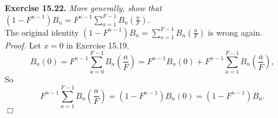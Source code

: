\documentclass{article}
\begin{document}
\textbf{Exercise 15.22.}
\emph{More generally, show that
$(1 - F^{n-1})B_n = F^{n-1} \sum_{a=1}^{F-1} B_n(\frac{a}{F})$.} \\

The original identity $(1 - F^{n-1})B_n = \sum_{a=1}^{F-1} B_n(\frac{a}{F})$
is wrong again. \\

\emph{Proof.}
Let $x = 0$ in Exercise 15.19,
$$B_n(0)
= F^{n-1} \sum_{a=0}^{F-1} B_n\left( \frac{a}{F} \right)
= F^{n-1} B_n(0) + F^{n-1} \sum_{a=1}^{F-1} B_n\left( \frac{a}{F} \right), $$
So
$$F^{n-1} \sum_{a=1}^{F-1} B_n\left( \frac{a}{F} \right)
= (1 - F^{n-1}) B_n(0)
= (1 - F^{n-1}) B_n.$$
$\Box$ \\\\
\end{document}
